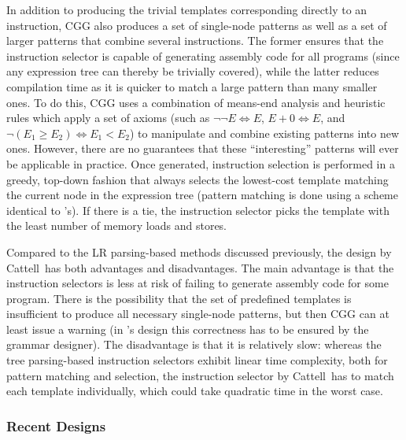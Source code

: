 {In addition to producing the trivial \glspl{template} corresponding directly to
an \gls{instruction}, \gls{CGG} also produces a set of single-\gls{node}
\glspl{pattern} as well as a set of larger \glspl{pattern} that combine several
\glspl{instruction}.
%
The former ensures that the \gls{instruction selector} is
capable of generating \gls{assembly code} for all \glspl{program} (since any
\gls{expression tree} can thereby be trivially covered), while the latter reduces
compilation time as it is quicker to match a large \gls{pattern} than many
smaller ones.
%
To do this, \gls{CGG} uses a combination of \gls{means-end
  analysis} and heuristic \glspl{rule} which apply a set of axioms (such as
\mbox{$\neg \neg E \Leftrightarrow E$}, \mbox{$E + 0 \Leftrightarrow E$}, and
\mbox{$\neg (E_1 \geq E_2) \Leftrightarrow E_1 < E_2$}) to manipulate and
combine existing \glspl{pattern} into new ones.
%
However, there are no guarantees
that these ``interesting'' \glspl{pattern} will ever be applicable in
practice.
%
Once generated, \gls{instruction selection} is performed in a greedy,
top-down fashion that always selects the lowest-cost \gls{template} matching the
current \gls{node} in the \gls{expression tree} (\gls{pattern matching} is done
using a scheme identical to \citeauthor{Newcomer1975}'s).
%
If there is a tie, the
\gls{instruction selector} picks the \gls{template} with the least number of
memory loads and stores.

Compared to the \gls{LR parsing}-based methods discussed previously, the design
by Cattell~\etal has both advantages and disadvantages.
%
The main advantage is
that the \glspl{instruction selector} is less at risk of failing to generate
\gls{assembly code} for some \gls{program}.
%
There is the possibility that the
set of predefined \glspl{template} is insufficient to produce all necessary
single-node \glspl{pattern}, but then \gls{CGG} can at least issue a warning (in
\citeauthor{Ganapathi1982b}'s design this correctness has to be ensured by the
\gls{grammar} designer).
%
The disadvantage is that it is relatively slow: whereas
the \gls{tree parsing}-based \glspl{instruction selector} exhibit linear time
complexity, both for \gls{pattern matching} and selection, the \gls{instruction
  selector} by Cattell~\etal has to match each \gls{template} individually,
which could take quadratic time in the worst case.


\subsubsection{Recent Designs}

}
